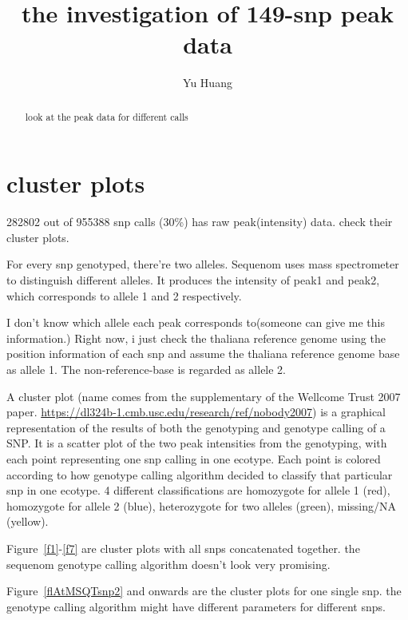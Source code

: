 \documentclass[a4paper,10pt]{article}
\title{the investigation of 149-snp peak data}
\author{Yu Huang}
\begin{document}
\maketitle

\begin{abstract}
look at the peak data for different calls
\end{abstract}

\section{cluster plots}
282802 out of 955388 snp calls (30\%) has raw peak(intensity) data. check their cluster plots.

For every snp genotyped, there're two alleles. Sequenom uses mass spectrometer to distinguish different alleles. It produces the intensity of peak1 and peak2, which corresponds to allele 1 and 2 respectively.

I don't know which allele each peak corresponds to(someone can give me this information.) Right now, i just check the thaliana reference genome using the position information of each snp and assume the thaliana reference genome base as allele 1. The non-reference-base is regarded as allele 2.

A cluster plot (name comes from the supplementary of the Wellcome Trust 2007 paper. \url{https://dl324b-1.cmb.usc.edu/research/ref/nobody2007}) is a graphical representation of the results of both the genotyping and genotype calling of a SNP. It is a scatter plot of the two peak intensities from the genotyping, with each point representing one snp calling in one ecotype. Each point is colored according to how genotype calling algorithm decided to classify that particular snp in one ecotype. 4 different classifications are homozygote for allele 1 (red), homozygote for allele 2 (blue), heterozygote for two alleles (green), missing/NA (yellow).

Figure~\ref{f1}-\ref{f7} are cluster plots with all snps concatenated together. the sequenom genotype calling algorithm doesn't look very promising.

Figure~\ref{flAtMSQTsnp2} and onwards are the cluster plots for one single snp. the genotype calling algorithm might have different parameters for different snps.
\end{document}

